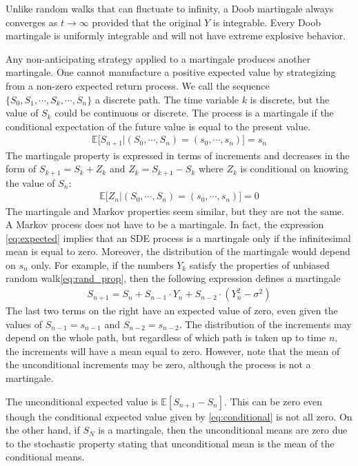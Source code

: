 Unlike random walks that can fluctuate to infinity, a Doob martingale \cite{wiki:doob-martingale} always converges as $t\rightarrow \infty$ provided that the original $Y$ is integrable. Every Doob martingale is uniformly integrable and will not have extreme explosive behavior.

Any non-anticipating strategy applied to a martingale \cite{wiki:martingale} produces another martingale. One cannot manufacture a positive expected value by strategizing from a non-zero expected return process. We call the sequence $\{S_0, S_1, \cdots, S_k, \cdots, S_n\}$ a discrete path. The time variable $k$ is discrete, but the value of $S_k$ could be continuous or discrete. The process is a martingale if the conditional expectation of the future value is equal to the present value.
\begin{align*}
\mathbb{E}\big[S_{n+1} \big| (S_0,\cdots,S_n)=(s_0, \cdots, s_n)\big] = s_n
\end{align*}
The martingale property is expressed in terms of increments and decreases in the form of $S_{k+1} = S_k + Z_k$ and $Z_k = S_{k+1} - S_k$ where $Z_k$ is conditional on knowing the value of $S_n$:
\begin{align}\label{eq:conditional}
\mathbb{E}\big[Z_n \big|(S_0,\cdots,S_n) = (s_0,\cdots,s_n)\big] = 0
\end{align}
The martingale and Markov properties seem similar, but they are not the same. A Markov process does not have to be a martingale. In fact, the expression \eqref{eq:expected} implies that an SDE process is a martingale only if the infinitesimal mean is equal to zero.  Moreover, the distribution of the martingale would depend on $s_n$ only. For example, if the numbers $Y_k$ satisfy the properties of unbiased random walk\eqref{eq:rand_prop}, then the following expression defines a martingale
\begin{align*}
S_{n+1}=S_n + S_{n-1}\cdot Y_n + S_{n-2}\cdot(Y_n^2 - \sigma^2)
\end{align*}
The last two terms on the right have an expected value of zero, even given the values of $S_{n-1}=s_{n-1}$ and $S_{n-2}=s_{n-2}$. The distribution of the increments may depend on the whole path, but regardless of which path is taken up to time $n$, the increments will have a mean equal to zero. However, note that the mean of the unconditional increments may be zero, although the process is not a martingale. 

The unconditional expected value is $\mathbb{E}[S_{n+1} - S_n]$. This can be zero even though the conditional expected value given by \eqref{eq:conditional} is not all zero. On the other hand, if $S_N$ is a martingale, then the unconditional means are zero due to the stochastic property stating that unconditional mean is the mean of the conditional means.

